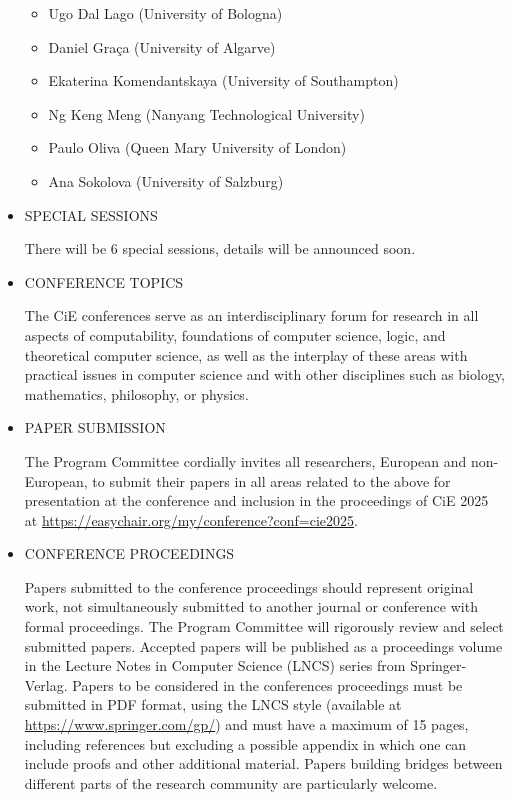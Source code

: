 \documentclass[prodmode,acmtecs]{acmsmall} %
\begin{document}
\begin{itemize}
\begin{itemize}\item  Ugo Dal Lago (University of Bologna)
\item  Daniel Graça (University of Algarve)
\item  Ekaterina Komendantskaya (University of Southampton)
\item  Ng Keng Meng (Nanyang Technological University)
\item  Paulo Oliva (Queen Mary University of London)
\item  Ana Sokolova (University of Salzburg)
\end{itemize} 
\item  SPECIAL SESSIONS 
 
  There will be 6 special sessions, details will be announced soon. 
 
\item  CONFERENCE TOPICS 
 
  The CiE conferences serve as an interdisciplinary forum for research in all aspects of computability, foundations of computer science, logic, and theoretical computer science, as well as the interplay of these areas with practical issues in computer science and with other disciplines such as biology, mathematics, philosophy, or physics. 
 
\item  PAPER SUBMISSION 
 
 The Program Committee cordially invites all researchers, European and non-European, to submit their papers in all areas related to the above for presentation at the conference and inclusion in the proceedings of CiE 2025 at \href{https://easychair.org/my/conference?conf=cie2025}{https://easychair.org/my/conference?conf=cie2025}. 
 
\item  CONFERENCE PROCEEDINGS 
 
  Papers submitted to the conference proceedings should represent original work, not simultaneously submitted to another journal or conference with formal proceedings. The Program Committee will rigorously review and select submitted papers. Accepted papers will be published as a proceedings volume in the Lecture Notes in Computer Science (LNCS) series from Springer-Verlag. Papers to be considered in the conferences proceedings must be submitted in PDF format, using the LNCS style (available at \href{https://www.springer.com/gp/}{https://www.springer.com/gp/}) and must have a maximum of 15 pages, including references but excluding a possible appendix in which one can include proofs and other additional material. Papers building bridges between different parts of the research community are particularly welcome. 
 

\end{itemize}
\end{document}
